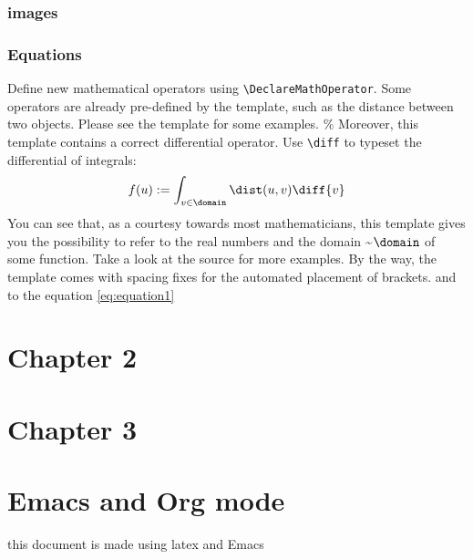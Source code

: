 \documentclass{tufte-org}
\begin{document}
\subsubsection{images}
\label{sec:org3a647b7}
\subsubsection{Equations}
\label{sec:orgcf84e76}
Define new mathematical operators using \verb|\DeclareMathOperator|.
Some operators are already pre-defined by the template, such as the
distance between two objects. Please see the template for some examples. 
\%
Moreover, this template contains a correct differential operator. Use \verb|\diff| to typeset the differential of integrals:
\begin{equation}\label{eq:equation1}
  f(u) := \int_{v \in \domain}\dist(u,v)\diff{v}
\end{equation}
You can see that, as a courtesy towards most mathematicians, this
template gives you the possibility to refer to the real numbers 
and the domain \textasciitilde{}\(\domain\) of some function. Take a look at the source for
more examples. By the way, the template comes with spacing fixes for the
automated placement of brackets.
and to the equation \eqref{eq:equation1}

\section[Configuration]{Chapter 2}
\label{sec:orgaa8841b}
\section[Conclusion]{Chapter 3}
\label{sec:org87ff922}
\appendix
\section{Emacs and Org mode}
\label{sec:orged80eff}
this document is made using \gls{latex} and Emacs

\backmatter
\begingroup
    \let\clearpage\relax
    \glsaddall
    \printglossary[type=\acronymtype]
    \newpage
    \printglossary
\endgroup
\printindex

\printbibliography
\end{document}
